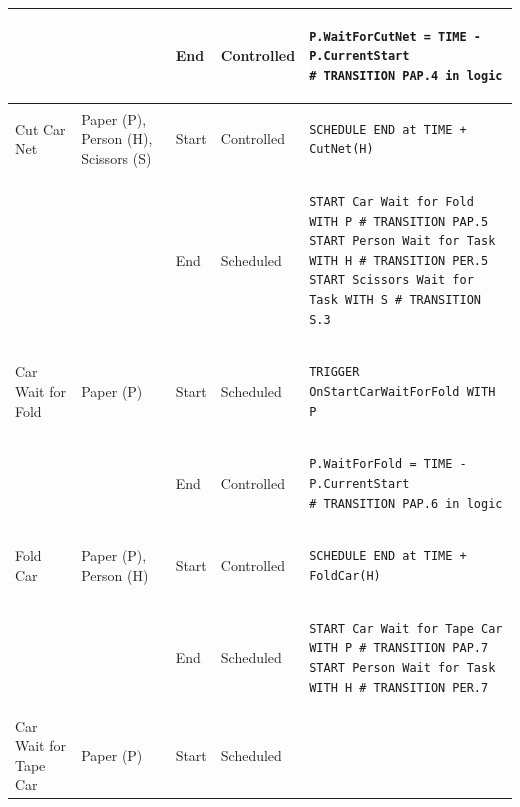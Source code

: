 \documentclass[
  10pt,
  a4paperpaper,
  DIV=11,
  numbers=noendperiod,
  oneside]{scrreprt}
\begin{document}
\begin{longtable}{@{}>{\raggedright\arraybackslash}p{1.8cm}>{\raggedright\arraybackslash}p{2.1cm}>{\raggedright\arraybackslash}p{0.9cm}>{\raggedright\arraybackslash}p{2.2cm}>{\raggedright\arraybackslash}p{8.75cm}@{}}
  &                                                          & End   & Controlled & 
\begin{lstlisting}[language=CMPseudo]
P.WaitForCutNet = TIME - P.CurrentStart
# TRANSITION PAP.4 in logic
\end{lstlisting}             \\ \midrule
  Cut Car Net               & Paper (P), Person (H), Scissors (S)     & Start & Controlled  & 
\begin{lstlisting}[language=CMPseudo]
SCHEDULE END at TIME + CutNet(H)
\end{lstlisting}             \\
  &                                                          & End   & Scheduled &
\begin{lstlisting}[language=CMPseudo]
START Car Wait for Fold WITH P # TRANSITION PAP.5
START Person Wait for Task WITH H # TRANSITION PER.5
START Scissors Wait for Task WITH S # TRANSITION S.3
\end{lstlisting}              \\ \midrule
  Car Wait for Fold         & Paper (P)                              & Start & Scheduled  & 
\begin{lstlisting}[language=CMPseudo]
TRIGGER OnStartCarWaitForFold WITH P
\end{lstlisting}             \\
  &                                                          & End   & Controlled & 
\begin{lstlisting}[language=CMPseudo]
P.WaitForFold = TIME - P.CurrentStart
# TRANSITION PAP.6 in logic
\end{lstlisting}             \\ \midrule
  Fold Car                  & Paper (P), Person (H)                  & Start & Controlled  & 
\begin{lstlisting}[language=CMPseudo]
SCHEDULE END at TIME + FoldCar(H)
\end{lstlisting}             \\
  &                                                          & End   & Scheduled & 
\begin{lstlisting}[language=CMPseudo]
START Car Wait for Tape Car WITH P # TRANSITION PAP.7
START Person Wait for Task WITH H # TRANSITION PER.7
\end{lstlisting}             \\ \midrule
  Car Wait for Tape Car     & Paper (P)                               & Start & Scheduled  & 
\begin{lstlisting}[language=CMPseudo]

\end{lstlisting}
\end{longtable}
\end{document}
